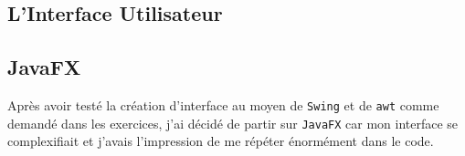 \addappheadtotoc

\begin{appendix}
\chapter{L'Interface Utilisateur}

\section{JavaFX}
\label{appendix:javafx}

Après avoir testé la création d'interface au moyen de \verb|Swing| et de \verb|awt| comme demandé dans les exercices, j'ai décidé de partir sur \verb|JavaFX| car mon interface se complexifiait et j'avais l'impression de me répéter énormément dans le code.

\end{appendix}

